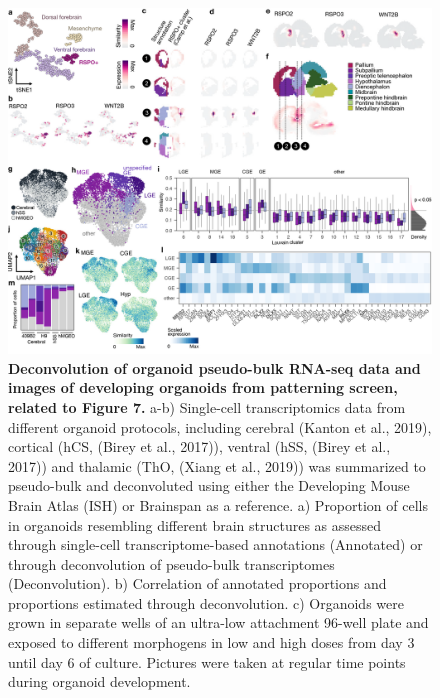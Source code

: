 \begin{figure}[h!]
    \centering
	\includegraphics[width=\textwidth]{figures/voxhunt/Supp_6}
    \caption{\textbf{Deconvolution of organoid pseudo-bulk RNA-seq data and images of developing organoids from patterning screen, related to Figure 7.} a-b) Single-cell transcriptomics data from different organoid protocols, including cerebral (Kanton et al., 2019), cortical (hCS, (Birey et al., 2017)), ventral (hSS, (Birey et al., 2017)) and thalamic (ThO, (Xiang et al., 2019)) was summarized to pseudo-bulk and deconvoluted using either the Developing Mouse Brain Atlas (ISH) or Brainspan as a reference. a) Proportion of cells in organoids resembling different brain structures as assessed through single-cell transcriptome-based annotations (Annotated) or through deconvolution of pseudo-bulk transcriptomes (Deconvolution). b) Correlation of annotated proportions and proportions estimated through deconvolution. c) Organoids were grown in separate wells of an ultra-low attachment 96-well plate and exposed to different morphogens in low and high doses from day 3 until day 6 of culture. Pictures were taken at regular time points during organoid development.}
    \label{fig:voxS7}
\end{figure}


\clearpage

\beginbibliography